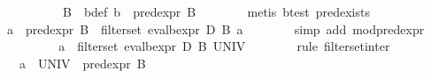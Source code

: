 \begin{isabellebody}
%
\isadelimproof
\ \ %
\endisadelimproof
%
\isatagproof
{}\isamarkupfalse%
\ {}\isanewline
\ \ \ \ \isamarkupfalse%
\ B\ \ b{}def{}\ {}b\ {}\ pred{}expr\ B{}\isanewline
\ \ \ \ \ \ \isamarkupfalse%
\ {}metis\ b{}test\ pred{}exists{}\isanewline
\ \ \ \ \isamarkupfalse%
\ {}a\ {}\ pred{}expr\ B\ {}\ filter{}set\ {}eval{}bexpr\ D\ B{}\ a{}\isanewline
\ \ \ \ \ \ \isamarkupfalse%
\ {}simp\ add{}\ mod{}pred{}expr{}\isanewline
\ \ \ \ \isamarkupfalse%
\ \isamarkupfalse%
\ {}{}{}{}\ {}\ a\ {}\ filter{}set\ {}eval{}bexpr\ D\ B{}\ UNIV{}\isanewline
\ \ \ \ \ \ \isamarkupfalse%
\ {}rule\ filter{}set{}inter{}\isanewline
\ \ \ \ \isamarkupfalse%
\ \isamarkupfalse%
\ {}{}{}{}\ {}\ a\ {}\ UNIV\ {}\ pred{}expr\ B{}\isanewline

\end{isabellebody}
